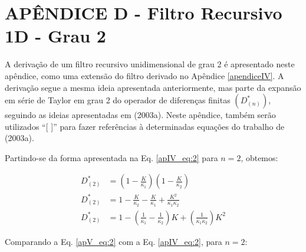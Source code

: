 
\chapter{APÊNDICE D - Filtro Recursivo 1D - Grau 2}
\label{apendiceV}

A derivação de um filtro recursivo unidimensional de grau 2 é apresentado neste apêndice, como uma extensão do filtro derivado no Apêndice \ref{apendiceIV}. A derivação segue a mesma ideia apresentada anteriormente, mas parte da expansão em série de Taylor em grau 2 do operador de diferenças finitas $(D^{*}_{(n)})$, seguindo as ideias apresentadas em  (2003a). Neste apêndice, também serão utilizados ``[ ]'' para fazer referências à determinadas equações do trabalho de  (2003a).

Partindo-se da forma apresentada na Eq. \ref{apIV_eq:2} para $n = 2$, obtemos:




\begin{align}
\label{apV_eq:1}
D^{*}_{(2)} & = \left( 1 - \frac{K}{\kappa_{1}} \right)  \left( 1 - \frac{K}{\kappa_{2}} \right) \\
\label{apV_eq:1.1}
D^{*}_{(2)} & = 1 - \frac{K}{\kappa_{2}} - \frac{K}{\kappa_{1}} + \frac{K^{2}}{\kappa_{1}\kappa_{2}} \\
\label{apV_eq:2}
D^{*}_{(2)} & = 1 - \left( \frac{1}{\kappa_{1}} - \frac{1}{\kappa_{2}} \right)K + \left( \frac{1}{\kappa_{1}\kappa_{2}} \right)K^{2}
\end{align}

Comparando a Eq. \ref{apV_eq:2} com a Eq. \ref{apIV_eq:2}, para $n = 2$:

